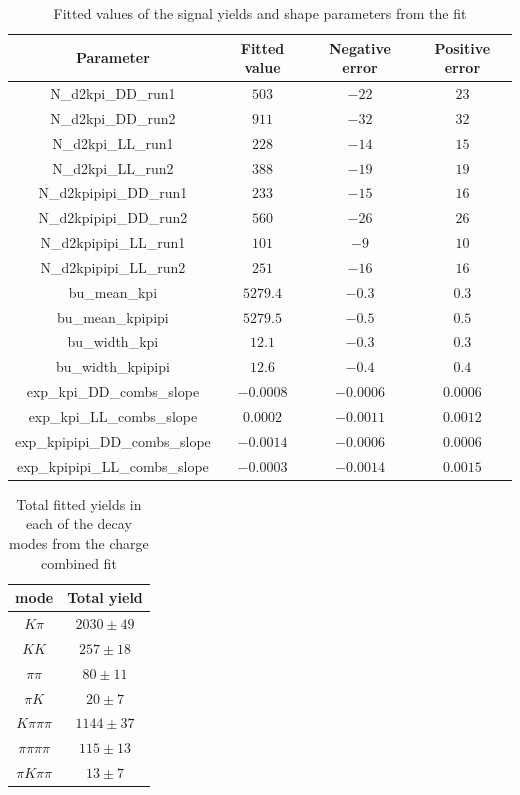 \begin{table}[h]
\centering
{\footnotesize
\begin{tabular}{cccc}
Parameter & Fitted value & Negative error & Positive error \\
\hline
N\_d2kpi\_DD\_run1 & $503$ & $-22$ & $23$ \\
N\_d2kpi\_DD\_run2 & $911$ & $-32$ & $32$ \\
N\_d2kpi\_LL\_run1 & $228$ & $-14$ & $15$ \\
N\_d2kpi\_LL\_run2 & $388$ & $-19$ & $19$ \\
N\_d2kpipipi\_DD\_run1 & $233$ & $-15$ & $16$ \\
N\_d2kpipipi\_DD\_run2 & $560$ & $-26$ & $26$ \\
N\_d2kpipipi\_LL\_run1 & $101$ & $-9$ & $10$ \\
N\_d2kpipipi\_LL\_run2 & $251$ & $-16$ & $16$ \\
bu\_mean\_kpi & $5279.4$ & $-0.3$ & $0.3$ \\
bu\_mean\_kpipipi & $5279.5$ & $-0.5$ & $0.5$ \\
bu\_width\_kpi & $12.1$ & $-0.3$ & $0.3$ \\
bu\_width\_kpipipi & $12.6$ & $-0.4$ & $0.4$ \\
exp\_kpi\_DD\_combs\_slope & $-0.0008$ & $-0.0006$ & $0.0006$ \\
exp\_kpi\_LL\_combs\_slope & $0.0002$ & $-0.0011$ & $0.0012$ \\
exp\_kpipipi\_DD\_combs\_slope & $-0.0014$ & $-0.0006$ & $0.0006$ \\
exp\_kpipipi\_LL\_combs\_slope & $-0.0003$ & $-0.0014$ & $0.0015$ \\
\end{tabular}}
\caption{Fitted values of the signal yields and shape parameters from the \CP fit}
\label{cpfitresultsshapes}
\end{table}


\begin{table}
\centering
\begin{tabular}{c|c}
\hline
\D mode & Total yield \\
\hline
$K\pi$ & $2030 \pm 49$ \\
$KK$ & $257 \pm 18$ \\
$\pi\pi$ & $80 \pm 11$ \\
$\pi K$ & $20 \pm 7$ \\
$K\pi\pi\pi$ & $1144 \pm 37$ \\
$\pi\pi\pi\pi$ & $115 \pm 13$ \\
$\pi K\pi\pi$ & $13 \pm 7$ \\
\hline
\end{tabular}
\caption{Total fitted yields in each of the \D decay modes from the charge combined fit}
\label{fittedyields}
\end{table}


